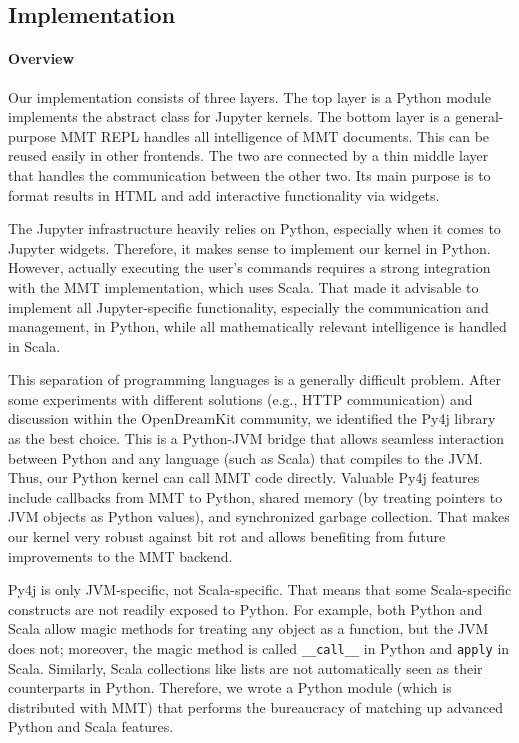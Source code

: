 \subsection{Implementation}\label{sec:kernel:impl}

\paragraph{Overview}
Our implementation consists of three layers.
The top layer is a Python module implements the abstract class for Jupyter kernels.
The bottom layer is a general-purpose MMT REPL handles all intelligence of MMT documents.
This can be reused easily in other frontends.
The two are connected by a thin middle layer that handles the communication between the other two.
Its main purpose is to format results in HTML and add interactive functionality via widgets.

The Jupyter infrastructure heavily relies on Python, especially when it comes to Jupyter widgets.
Therefore, it makes sense to implement our kernel in Python.
However, actually executing the user's commands requires a strong integration with the MMT implementation, which uses Scala.
That made it advisable to implement all Jupyter-specific functionality, especially the communication and management, in Python, while all mathematically relevant intelligence is handled in Scala.

This separation of programming languages is a generally difficult problem.
After some experiments with different solutions (e.g., HTTP communication) and discussion within the OpenDreamKit community, we identified the Py4j library as the best choice.
This is a Python-JVM bridge that allows seamless interaction between Python and any language (such as Scala) that compiles to the JVM.
Thus, our Python kernel can call MMT code directly.
Valuable Py4j features include callbacks from MMT to Python, shared memory (by treating pointers to JVM objects as Python values), and synchronized garbage collection.
That makes our kernel very robust against bit rot and allows benefiting from future improvements to the MMT backend.

Py4j is only JVM-specific, not Scala-specific.
That means that some Scala-specific constructs are not readily exposed to Python.
For example, both Python and Scala allow magic methods for treating any object as a function, but the JVM does not; moreover, the magic method is called \texttt{\_\_call\_\_} in Python and \texttt{apply} in Scala.
Similarly, Scala collections like lists are not automatically seen as their counterparts in Python.
Therefore, we wrote a Python module (which is distributed with MMT) that performs the bureaucracy of matching up advanced Python and Scala features.

